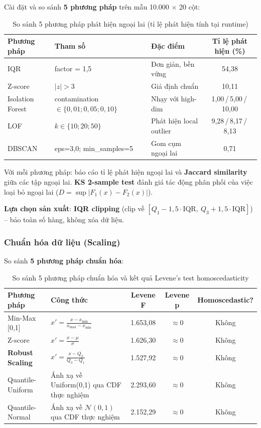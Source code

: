 \documentclass[12pt,a4paper]{article}
\let\oldtextbf\textbf
\renewcommand{\textbf}[1]{\oldtextbf{\textcolor{hcmublue}{#1}}}
\begin{document}
Cài đặt và so sánh \textbf{5 phương pháp} trên mẫu 10.000 $\times$ 20 cột:

\begin{table}[H]
\centering
\begin{tabular}{|l|l|l|c|}
\hline
\textbf{Phương pháp} & \textbf{Tham số} & \textbf{Đặc điểm} & \textbf{Tỉ lệ phát hiện (\%)} \\ \hline
IQR & factor = 1,5 & Đơn giản, bền vững & 54{,}38 \\ \hline
Z-score & $|z| > 3$ & Giả định chuẩn & 10{,}11 \\ \hline
Isolation Forest & contamination $\in \{0{,}01; 0{,}05; 0{,}10\}$ & Nhạy với high-dim & 1{,}00\,/\,5{,}00\,/\,10{,}00 \\ \hline
LOF & $k \in \{10; 20; 50\}$ & Phát hiện local outlier & 9{,}28\,/\,8{,}17\,/\,8{,}13 \\ \hline
DBSCAN & eps=3,0; min\_samples=5 & Gom cụm ngoại lai & 0{,}71 \\ \hline
\end{tabular}
\caption{So sánh 5 phương pháp phát hiện ngoại lai (tỉ lệ phát hiện tính tại runtime)}
\label{tab:outlier_methods}
\end{table}

Với mỗi phương pháp: báo cáo tỉ lệ phát hiện ngoại lai và \textbf{Jaccard similarity} giữa các tập ngoại lai. \textbf{KS 2-sample test} đánh giá tác động phân phối của việc loại bỏ ngoại lai ($D = \sup|F_1(x) - F_2(x)|$).

\textbf{Lựa chọn sản xuất}: \textbf{IQR clipping} (clip về $[Q_1 - 1{,}5 \cdot \text{IQR},\ Q_3 + 1{,}5 \cdot \text{IQR}]$) -- bảo toàn số hàng, không xóa dữ liệu.

\subsubsection{Chuẩn hóa dữ liệu (Scaling)}

So sánh \textbf{5 phương pháp chuẩn hóa}:

\begin{table}[H]
\centering
\begin{tabular}{|l|l|c|c|c|}
\hline
\textbf{Phương pháp} & \textbf{Công thức} & \textbf{Levene F} & \textbf{Levene p} & \textbf{Homoscedastic?} \\ \hline
Min-Max [0,1]  & $x' = \frac{x - x_{\min}}{x_{\max} - x_{\min}}$ & 1.653{,}08 & $\approx 0$ & Không \\ \hline
Z-score        & $x' = \frac{x - \mu}{\sigma}$ & 1.626{,}30 & $\approx 0$ & Không \\ \hline
\textbf{Robust Scaling} & $x' = \frac{x - Q_2}{Q_3 - Q_1}$ & 1.527{,}92 & $\approx 0$ & Không \\ \hline
Quantile-Uniform & Ánh xạ về Uniform(0,1) qua CDF thực nghiệm & 2.293{,}60 & $\approx 0$ & Không \\ \hline
Quantile-Normal  & Ánh xạ về $\mathcal{N}(0,1)$ qua CDF thực nghiệm & 2.152{,}29 & $\approx 0$ & Không \\ \hline
\end{tabular}
\caption{So sánh 5 phương pháp chuẩn hóa và kết quả Levene's test homoscedasticity}
\label{tab:scaling_methods}
\end{table}
\end{document}
